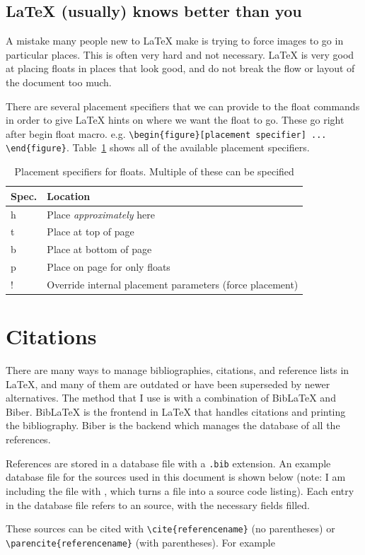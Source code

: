 \documentclass{article}
\begin{document}
\subsection{\LaTeX{} (usually) knows better than you}
A mistake many people new to \LaTeX{} make is trying to force images to go in particular places. This is often very hard and not necessary. \LaTeX{} is very good at placing floats in places that look good, and do not break the flow or layout of the document too much.

There are several placement specifiers that we can provide to the float commands in order to give \LaTeX{} hints on where we want the float to go. These go right after begin float macro. e.g. \lstinline|\begin{figure}[placement specifier] ... \end{figure}|. Table~\ref{tab:placement-specs} shows all of the available placement specifiers.

\begin{table}
    \centering
    \caption{Placement specifiers for floats. Multiple of these can be specified}
    \label{tab:placement-specs}
    \begin{tabular}{ll}
      \toprule
      Spec. & Location \\
      \midrule
      h & Place \emph{approximately} here \\
      t & Place at top of page \\
      b & Place at bottom of page \\
      p & Place on page for only floats \\
      ! & Override internal placement parameters (force placement) \\
      \bottomrule
    \end{tabular}
\end{table}


\section{Citations}
There are many ways to manage bibliographies, citations, and reference lists in \LaTeX{}, and many of them are outdated or have been superseded by newer alternatives. The method that I use is with a combination of BibLaTeX and Biber. BibLaTeX is the frontend in \LaTeX{} that handles citations and printing the bibliography. Biber is the backend which manages the database of all the references.

References are stored in a database file with a \lstinline{.bib} extension. An example database file for the sources used in this document is shown below (note: I am including the file with \lstinline||, which turns a file into a source code listing). Each entry in the database file refers to an source, with the necessary fields filled. 

These sources can be cited with \lstinline|\cite{referencename}| (no parentheses) or \lstinline|\parencite{referencename}| (with parentheses). For example \parencite{strzodka_gpu-accelerated_2013} \parencite{yu_gpu_2014}





\printbibliography
\end{document}
